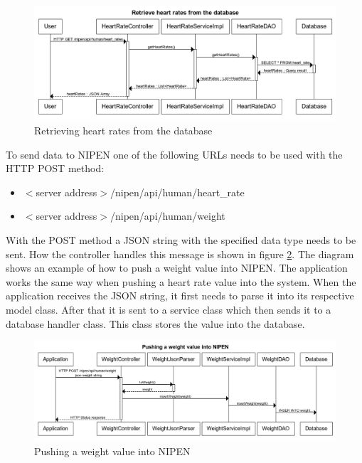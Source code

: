 \begin{figure}[h]
\centering
\includegraphics[scale=0.6]{../Figures/retrieve-heart-rates-from-the-database.png}
\caption{Retrieving heart rates from the database}
\label{figure:retrieve-heart-rates-from-the-database}
\end{figure}

To send data to NIPEN one of the following URLs needs to be used with the HTTP POST method:

\begin{itemize}
\item $<$server address$>$/nipen/api/human/heart\_rate
\item $<$server address$>$/nipen/api/human/weight
\end{itemize}

With the POST method a JSON string with the specified data type needs to be sent. 
How the controller handles this message is shown in figure \ref{figure:pushing-weight-into-NIPEN}.
The diagram shows an example of how to push a weight value into NIPEN.
The application works the same way when pushing a heart rate value into the system.
When the application receives the JSON string, it first needs to parse it into its respective model class.
After that it is sent to a service class which then sends it to a database handler class.
This class stores the value into the database.

\begin{figure}[h]
\centering
\includegraphics[scale=0.55]{../Figures/pushing-weight-into-NIPEN.png}
\caption{Pushing a weight value into NIPEN}
\label{figure:pushing-weight-into-NIPEN}
\end{figure}

